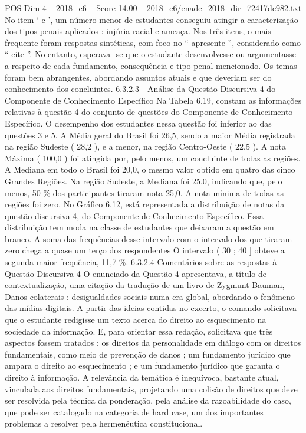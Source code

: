\begin{textsample}{POS Dim 4 – 2018\_c6 – Score 14.00 – 2018\_c6/enade\_2018\_dir\_72417de982.txt}
No item ‘ c ’, um número menor de estudantes conseguiu atingir a caracterização dos tipos penais aplicados : injúria racial e ameaça.
Nos três itens, o mais frequente foram respostas sintéticas, com foco no “ apresente ”, considerado como “ cite ”.
No entanto, esperava -se que o estudante desenvolvesse ou argumentasse a respeito de cada fundamento, consequência e tipo penal mencionado.
Os temas foram bem abrangentes, abordando assuntos atuais e que deveriam ser do conhecimento dos concluintes. 6.3.2.3 - Análise da Questão Discursiva 4 do Componente de Conhecimento Específico Na Tabela 6.19, constam as informações relativas à questão 4 do conjunto de questões do Componente de Conhecimento Específico.
O desempenho dos estudantes nessa questão foi inferior ao das questões 3 e 5.
A Média geral do Brasil foi 26,5, sendo a maior Média registrada na região Sudeste ( 28,2 ), e a menor, na região Centro-Oeste ( 22,5 ).
A nota Máxima ( 100,0 ) foi atingida por, pelo menos, um concluinte de todas as regiões.
A Mediana em todo o Brasil foi 20,0, o mesmo valor obtido em quatro das cinco Grandes Regiões.
Na região Sudeste, a Mediana foi 25,0, indicando que, pelo menos, 50 \% dos participantes tiraram nota 25,0.
A nota mínima de todas as regiões foi zero.
No Gráfico 6.12, está representada a distribuição de notas da questão discursiva 4, do Componente de Conhecimento Específico.
Essa distribuição tem moda na classe de estudantes que deixaram a questão em branco.
A soma das frequências desse intervalo com o intervalo dos que tiraram zero chega a quase um terço dos respondentes O intervalo ( 30 ; 40 ] obteve a segunda maior frequência, 11,7 \%. 6.3.2.4 Comentários sobre as respostas à Questão Discursiva 4 O enunciado da Questão 4 apresentava, a título de contextualização, uma citação da tradução de um livro de Zygmunt Bauman, Danos colaterais : desigualdades sociais numa era global, abordando o fenômeno das mídias digitais.
A partir das ideias contidas no excerto, o comando solicitava que o estudante redigisse um texto acerca do direito ao esquecimento na sociedade da informação.
E, para orientar essa redação, solicitava que três aspectos fossem tratados : os direitos da personalidade em diálogo com os direitos fundamentais, como meio de prevenção de danos ; um fundamento jurídico que ampara o direito ao esquecimento ; e um fundamento jurídico que garanta o direito à informação.
A relevância da temática é inequívoca, bastante atual, vinculada aos direitos fundamentais, projetando uma colisão de direitos que deve ser resolvida pela técnica da ponderação, pela análise da razoabilidade do caso, que pode ser catalogado na categoria de hard case, um dos importantes problemas a resolver pela hermenêutica constitucional.

\end{textsample}
